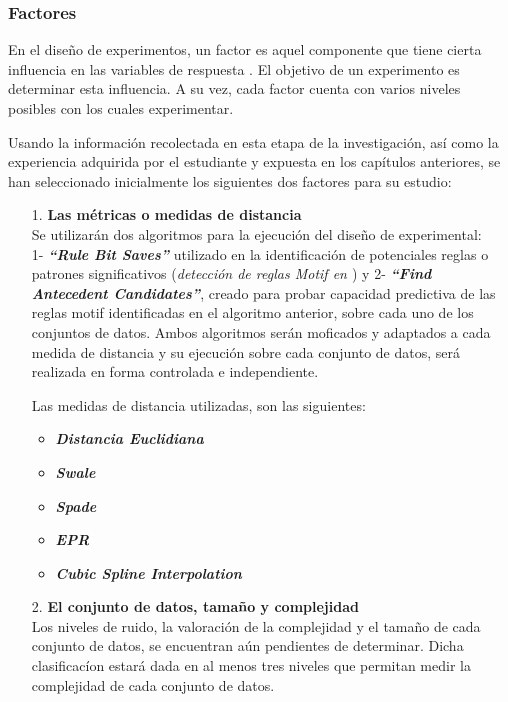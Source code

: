 \subsubsection{Factores}
En el dise\~no de experimentos, un factor es aquel componente que tiene cierta
influencia en las variables de respuesta \cite{montgomeryx}. El objetivo de un experimento es determinar esta influencia. A su vez, cada factor cuenta con varios niveles posibles con los cuales experimentar.\par
Usando la informaci\'on recolectada en esta etapa de la investigaci\'on, as\'i como la experiencia adquirida por el estudiante y expuesta en los cap\'itulos anteriores, se han seleccionado inicialmente los siguientes dos factores para su estudio:
\begin{itemize}
\item [1.] \textbf{Las m\'etricas o medidas de distancia}\\
Se utilizar\'an dos algoritmos para la ejecuci\'on del dise\~no de experimental:\\
1- \textit{\textbf{\enquote{Rule Bit Saves}}} utilizado en la identificaci\'on de potenciales reglas o patrones significativos (\textit{\textit{detecci\'on de reglas \textit{Motif en \cite{main}}}}) y 2- \textit{\textbf{\enquote{Find Antecedent Candidates}}}, creado para probar capacidad predictiva de las reglas motif identificadas en el algoritmo anterior, sobre cada uno de los conjuntos de datos. Ambos algoritmos ser\'an moficados y adaptados a cada medida de distancia y su ejecuci\'on sobre cada conjunto de datos, ser\'a realizada en forma controlada e independiente.\par
Las medidas de distancia utilizadas, son las siguientes:
\begin{itemize}
\item \textbf{\textit{Distancia Euclidiana}}
\item \textbf{\textit{Swale}}
\item \textbf{\textit{Spade}}
\item \textbf{\textit{EPR}}
\item \textbf{\textit{Cubic Spline Interpolation}}
\end{itemize}
\item [2.] \textbf{El conjunto de datos, tama\~no y complejidad}\\
Los niveles de ruido, la valoraci\'on de la complejidad y el tama\~no de cada conjunto de datos, se encuentran a\'un pendientes de determinar. Dicha clasificac\'ion estar\'a dada en al menos tres niveles que permitan medir la complejidad de cada conjunto de datos.\\

\end{itemize}
